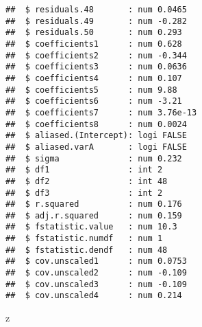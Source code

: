 \documentclass[
]{article}
\newenvironment{Shaded}{\begin{snugshade}}{\end{snugshade}}
\newcommand{\NormalTok}[1]{#1}
\begin{document}
\begin{verbatim}
##  $ residuals.48       : num 0.0465
##  $ residuals.49       : num -0.282
##  $ residuals.50       : num 0.293
##  $ coefficients1      : num 0.628
##  $ coefficients2      : num -0.344
##  $ coefficients3      : num 0.0636
##  $ coefficients4      : num 0.107
##  $ coefficients5      : num 9.88
##  $ coefficients6      : num -3.21
##  $ coefficients7      : num 3.76e-13
##  $ coefficients8      : num 0.0024
##  $ aliased.(Intercept): logi FALSE
##  $ aliased.varA       : logi FALSE
##  $ sigma              : num 0.232
##  $ df1                : int 2
##  $ df2                : int 48
##  $ df3                : int 2
##  $ r.squared          : num 0.176
##  $ adj.r.squared      : num 0.159
##  $ fstatistic.value   : num 10.3
##  $ fstatistic.numdf   : num 1
##  $ fstatistic.dendf   : num 48
##  $ cov.unscaled1      : num 0.0753
##  $ cov.unscaled2      : num -0.109
##  $ cov.unscaled3      : num -0.109
##  $ cov.unscaled4      : num 0.214
\end{verbatim}

\begin{Shaded}
\begin{Highlighting}[]
\NormalTok{z}
\end{Highlighting}
\end{Shaded}
\end{document}
